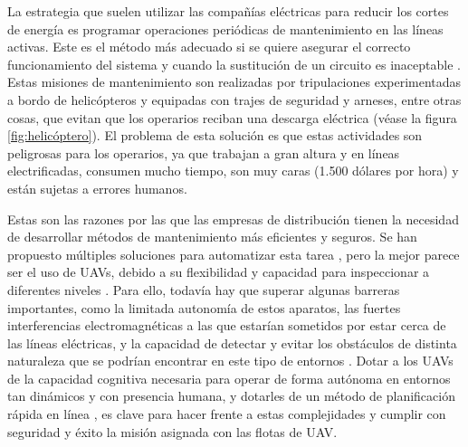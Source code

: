 \documentclass[fontsize=11pt, English=false, Español=true, Myfinal=true, twoside, numbers=noenddot]{scrbook}
\begin{document}
La estrategia que suelen utilizar las compañías eléctricas para reducir los cortes de energía es programar operaciones periódicas de mantenimiento en las líneas activas. Este es el método más adecuado si se quiere asegurar el correcto funcionamiento del sistema y cuando la sustitución de un circuito es inaceptable \cite{CausasDeLosCortesDeEnergía}. Estas misiones de mantenimiento son realizadas por tripulaciones experimentadas a bordo de helicópteros y equipadas con trajes de seguridad y arneses, entre otras cosas, que evitan que los operarios reciban una descarga eléctrica (véase la figura \ref{fig:helicóptero}). El problema de esta solución es que estas actividades son peligrosas para los operarios, ya que trabajan a gran altura y en líneas electrificadas, consumen mucho tiempo, son muy caras (1.500 dólares por hora) y están sujetas a errores humanos.

Estas son las razones por las que las empresas de distribución tienen la necesidad de desarrollar métodos de mantenimiento más eficientes y seguros. Se han propuesto múltiples soluciones para automatizar esta tarea \cite{SolucionesDeMantenimiento}, pero la mejor parece ser el uso de \glspl{UAV}, debido a su flexibilidad y capacidad para inspeccionar a diferentes niveles \cite{CausasDeCorteDeEnergía}. Para ello, todavía hay que superar algunas barreras importantes, como la limitada autonomía de estos aparatos, las fuertes interferencias electromagnéticas a las que estarían sometidos por estar cerca de las líneas eléctricas, y la capacidad de detectar y evitar los obstáculos de distinta naturaleza que se podrían encontrar en este tipo de entornos \cite{CosteDeMantenimiento}. Dotar a los \glspl{UAV} de la capacidad cognitiva necesaria para operar de forma autónoma en entornos tan dinámicos y con presencia humana, y dotarles de un método de planificación rápida en línea \cite{FastOnlinePlanning}, es clave para hacer frente a estas complejidades y cumplir con seguridad y éxito la misión asignada con las flotas de \gls{UAV}.
\end{document}
